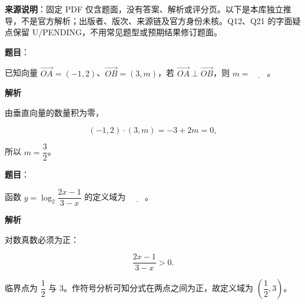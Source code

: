 

\begin{gktip}
\textbf{来源说明}：固定 PDF 仅含题面，没有答案、解析或评分页。以下是本库独立推导，不是官方解析；出版者、版次、来源链及官方身份未核。Q12、Q21 的字面疑点保留 U/PENDING，不用常见题型或预期结果修订题面。
\end{gktip}


\begin{answer}

\textbf{题目}：

已知向量 $\overrightarrow{OA}=(-1,2)$、$\overrightarrow{OB}=(3,m)$，若 $\overrightarrow{OA}\perp\overrightarrow{OB}$，则 $m=\underline{\qquad}$。

\textbf{解析}

由垂直向量的数量积为零，

\nopagebreak[4]
\[
(-1,2)\cdot(3,m)=-3+2m=0,
\]

所以 $m=\dfrac32$。


\end{answer}
\begin{answer}

\textbf{题目}：

函数 $y=\log_{2}\dfrac{2x-1}{3-x}$ 的定义域为 $\underline{\qquad}$。

\textbf{解析}

对数真数必须为正：

\nopagebreak[4]
\[
\frac{2x-1}{3-x}>0.
\]

临界点为 $\dfrac12$ 与 $3$。作符号分析可知分式在两点之间为正，故定义域为 $\left(\dfrac12,3\right)$。


\end{answer}
